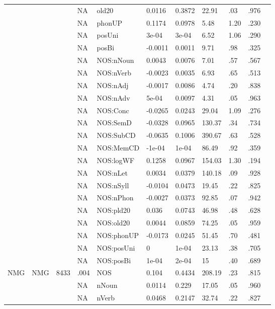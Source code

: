 \begin{table}[ht]
\begin{tabular}{lllllllllll}
   &  &  & NA & old20 & 0.0116 & 0.3872 & 22.91 & .03 & .976 &   \\ 
   &  &  & NA & phonUP & 0.1174 & 0.0978 & 5.48 & 1.20 & .230 &   \\ 
   &  &  & NA & posUni & 3e-04 & 3e-04 & 6.52 & 1.06 & .290 &   \\ 
   &  &  & NA & posBi & -0.0011 & 0.0011 & 9.71 & .98 & .325 &   \\ 
   &  &  & NA & NOS:nNoun & 0.0043 & 0.0076 & 7.01 & .57 & .567 &   \\ 
   &  &  & NA & NOS:nVerb & -0.0023 & 0.0035 & 6.93 & .65 & .513 &   \\ 
   &  &  & NA & NOS:nAdj & -0.0017 & 0.0086 & 4.74 & .20 & .838 &   \\ 
   &  &  & NA & NOS:nAdv & 5e-04 & 0.0097 & 4.31 & .05 & .963 &   \\ 
   &  &  & NA & NOS:Conc & -0.0265 & 0.0243 & 29.04 & 1.09 & .276 &   \\ 
   &  &  & NA & NOS:SemD & -0.0328 & 0.0965 & 130.37 & .34 & .734 &   \\ 
   &  &  & NA & NOS:SubCD & -0.0635 & 0.1006 & 390.67 & .63 & .528 &   \\ 
   &  &  & NA & NOS:MemCD & -1e-04 & 1e-04 & 86.49 & .92 & .359 &   \\ 
   &  &  & NA & NOS:logWF & 0.1258 & 0.0967 & 154.03 & 1.30 & .194 &   \\ 
   &  &  & NA & NOS:nLet & 0.0034 & 0.0379 & 140.18 & .09 & .928 &   \\ 
   &  &  & NA & NOS:nSyll & -0.0104 & 0.0473 & 19.45 & .22 & .825 &   \\ 
   &  &  & NA & NOS:nPhon & -0.0027 & 0.0373 & 92.85 & .07 & .942 &   \\ 
   &  &  & NA & NOS:pld20 & 0.036 & 0.0743 & 46.98 & .48 & .628 &   \\ 
   &  &  & NA & NOS:old20 & 0.0044 & 0.0859 & 74.25 & .05 & .959 &   \\ 
   &  &  & NA & NOS:phonUP & -0.0173 & 0.0245 & 51.45 & .70 & .481 &   \\ 
   &  &  & NA & NOS:posUni & 0 & 1e-04 & 23.13 & .38 & .705 &   \\ 
   &  &  & NA & NOS:posBi & 1e-04 & 2e-04 & 15 & .40 & .689 &   \\ 
  NMG & NMG & 8433 & .004 & NOS & 0.104 & 0.4434 & 208.19 & .23 & .815 &   \\ 
   &  &  & NA & nNoun & 0.0114 & 0.229 & 17.05 & .05 & .960 &   \\ 
   &  &  & NA & nVerb & 0.0468 & 0.2147 & 32.74 & .22 & .827 &   \\ 

\end{tabular}
\end{table}
